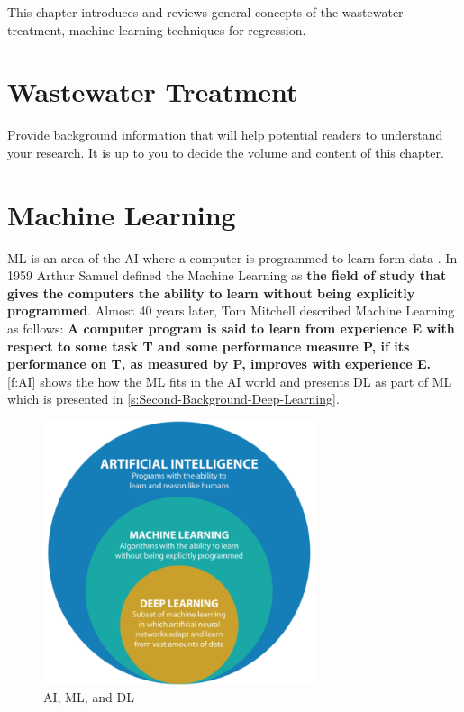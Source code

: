 This chapter introduces and reviews general concepts of the wastewater treatment, machine learning techniques for regression.

\section{Wastewater Treatment}
\label{s:First-Background-Topic}

Provide background information that will help potential readers to understand your research. It is up to you to decide the volume and content of this chapter.



\section{Machine Learning}
\label{s:Second-Background-Topic}

\ac{ML} is an area of the \ac{AI} where a computer is programmed to learn form data \cite{Ray2019}. In 1959 Arthur Samuel defined the Machine Learning as \textbf{the field of study that gives the computers the ability to learn without being explicitly programmed}. Almost 40 years later, Tom Mitchell described Machine Learning as follows: \textbf{A computer program is said to learn from experience E with respect to some task T and some performance measure P, if its performance on T, as measured by P, improves with experience E.} \autoref{f:AI} shows the how the \ac{ML} fits in the \ac{AI} world and presents \ac{DL} as part of \ac{ML} which is presented in \autoref{s:Second-Background-Deep-Learning}.

\begin{figure}[h]
\centering
\includegraphics[width=8cm]{figures/Ch2/AI-ML-DL.png}
\caption{AI, ML, and DL \cite{raza_cinquergrana_2018}}
\label{f:AI}
\end{figure}

